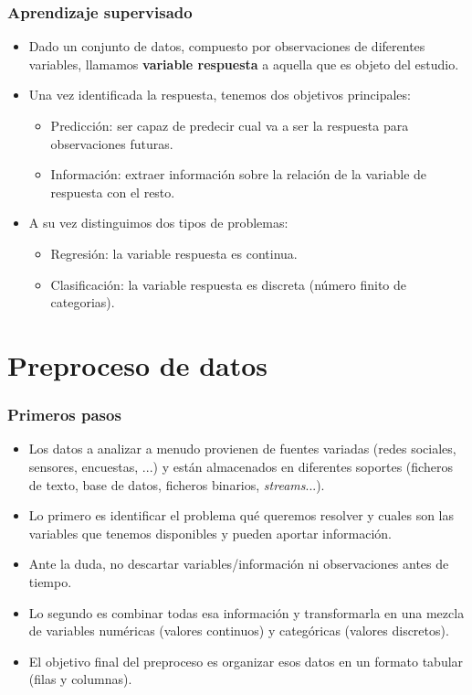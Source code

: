 \documentclass{beamer}
\begin{document}
\begin{frame}
\frametitle{Aprendizaje supervisado}

\begin{itemize}
\item Dado un conjunto de datos, compuesto por observaciones de diferentes variables, llamamos \textbf{variable respuesta} a aquella que es objeto del estudio.

\item Una vez identificada la respuesta, tenemos dos objetivos principales:

\begin{itemize}
\item Predicción: ser capaz de predecir cual va a ser la respuesta para observaciones futuras.
\item Información: extraer información sobre la relación de la variable de respuesta con el resto.
\end{itemize}

\item A su vez distinguimos dos tipos de problemas:

\begin{itemize}
\item Regresión: la variable respuesta es continua.
\item Clasificación: la variable respuesta es discreta (número finito de categorias).
\end{itemize}
\end{itemize}
\end{frame}


\section{Preproceso de datos}

\begin{frame}
\frametitle{Primeros pasos}

\begin{itemize}
\item Los datos a analizar a menudo provienen de fuentes variadas (redes sociales, sensores, encuestas, ...) y están almacenados en diferentes soportes (ficheros de texto, base de datos, ficheros binarios, \textit{streams}...).
\item Lo primero es identificar el problema qué queremos resolver y cuales son las variables que tenemos disponibles y pueden aportar información.
\item Ante la duda, no descartar variables/información ni observaciones antes de tiempo.
\item Lo segundo es combinar todas esa información y transformarla en una mezcla de variables numéricas (valores continuos) y categóricas (valores discretos).
\item El objetivo final del preproceso es organizar esos datos en un formato tabular (filas y columnas).
\end{itemize}

\end{frame}
\end{document}
